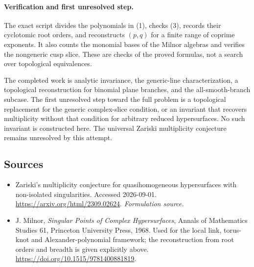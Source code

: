 \documentclass[11pt]{article}
\begin{document}
\paragraph{Verification and first unresolved step.}
The exact script divides the polynomials in (1), checks (3), records their cyclotomic root orders, and reconstructs $(p,q)$ for a finite range of coprime exponents. It also counts the monomial bases of the Milnor algebras and verifies the nongeneric cusp slice. These are checks of the proved formulas, not a search over topological equivalences.

The completed work is analytic invariance, the generic-line characterization, a topological reconstruction for binomial plane branches, and the all-smooth-branch subcase. The first unresolved step toward the full problem is a topological replacement for the generic complex-slice condition, or an invariant that recovers multiplicity without that condition for arbitrary reduced hypersurfaces. No such invariant is constructed here. The universal Zariski multiplicity conjecture remains unresolved by this attempt.

\subsection{Sources}
\begin{itemize}
\item[S1]Zariski's multiplicity conjecture for quasihomogeneous hypersurfaces with non-isolated singularities. Accessed 2026-09-01.
\url{https://arxiv.org/html/2309.02624}.
\textit{Formulation source.}
\item[E1]J. Milnor, \textit{Singular Points of Complex Hypersurfaces}, Annals of Mathematics Studies 61, Princeton University Press, 1968. Used for the local link, torus-knot and Alexander-polynomial framework; the reconstruction from root orders and breadth is given explicitly above.
\url{https://doi.org/10.1515/9781400881819}.

\end{itemize}
\end{document}
